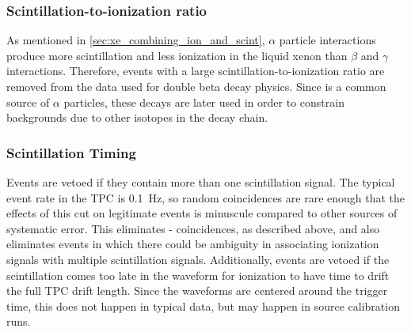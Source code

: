 \documentclass[herrin-thesis.tex]{subfiles}
\begin{document}
\subsubsection{Scintillation-to-ionization ratio}
As mentioned in \cref{sec:xe_combining_ion_and_scint}, \(\alpha\) particle interactions produce more scintillation and less ionization in the liquid xenon than \(\beta\) and \(\gamma\) interactions. Therefore, events with a large scintillation-to-ionization ratio are removed from the data used for double beta decay physics. Since  is a common source of \(\alpha\) particles, these decays are later used in order to constrain backgrounds due to other isotopes in the  decay chain.

\subsubsection{Scintillation Timing}
Events are vetoed if they contain more than one scintillation signal. The typical event rate in the TPC is \about{}\SI{0.1}{\Hz}, so random coincidences are rare enough that the effects of this cut on legitimate events is minuscule compared to other sources of systematic error. This eliminates - coincidences, as described above, and also eliminates events in which there could be ambiguity in associating ionization signals with multiple scintillation signals. Additionally, events are vetoed if the scintillation comes too late in the waveform for ionization to have time to drift the full TPC drift length. Since the waveforms are centered around the trigger time, this does not happen in typical data, but may happen in source calibration runs.
\end{document}
